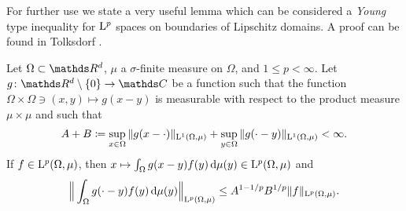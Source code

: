 
For further use we state a very useful lemma which can be considered a \emph{Young} type inequality for $\mathrm{L}^p$ spaces on boundaries of Lipschitz domains.
A proof can be found in Tolksdorf \cite[Prop 1.1.4]{tolksdorf}.

\begin{lem}
  \label{lem:young}
  Let $\Omega \subset \R^d$, $\mu$ a $\sigma$-finite measure on $\Omega$, and $1 \leq p < \infty$.
  Let $g \colon \R^d \setminus \{ 0\} \to \C$ be a function such that the function $\Omega \times \Omega \ni (x, y) \mapsto g(x-y)$ is measurable with respect to the product measure $\mu \times \mu$ and such that
  \begin{align*}
    A + B \coloneqq \sup_{x \in \Omega} \| g(x - \cdot) \|_{\mathrm{L}^1(\Omega, \mu)} + \sup_{y \in \Omega} \|g(\cdot - y) \|_{\mathrm{L}^1(\Omega, \mu)} < \infty.
  \end{align*}
  If $f \in \mathrm{L}^p(\Omega, \mu)$, then $x \mapsto \int_\Omega g(x - y) f(y) \, {\operatorname{d}\!{\mu}}(y) \in \mathrm{L}^p(\Omega, \mu)$ and
  \begin{align*}
    \Big\| \int_\Omega g(\cdot - y) f(y) \, {\operatorname{d}\!{\mu}}(y) \Big\|_{\mathrm{L}^p(\Omega, \mu)} \leq A^{1 - 1/p} B^{1/p} \|f\|_{\mathrm{L}^p(\Omega, \mu)}.
  \end{align*}
\end{lem}

